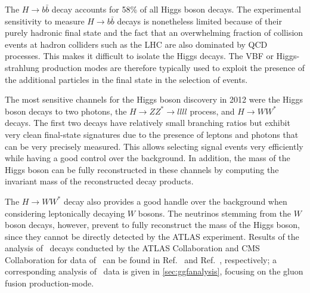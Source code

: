 The $H\rightarrow b\bar{b}$ decay accounts for 58\% of all Higgs boson decays. The experimental sensitivity to measure $H\rightarrow b\bar{b}$ decays is nonetheless limited because of their purely hadronic final state and the fact that an overwhelming fraction of collision events at hadron colliders such as the LHC are also dominated by QCD processes. This makes it difficult to isolate the Higgs decays. The VBF or Higgs-strahlung production modes are therefore typically used to exploit the  presence of the additional particles in the final state in the selection of events.

The most sensitive channels for the Higgs boson discovery in 2012 were the Higgs boson decays to two photons, the $H \rightarrow ZZ^* \rightarrow llll$ process, and $H \to WW^*$ decays.
The first two decays have relatively small branching ratios but exhibit very clean final-state signatures due to the presence of leptons and photons that can be very precisely measured.
This allows selecting signal events very efficiently while having a good control over the background.
In addition, the mass of the Higgs boson can be fully reconstructed in these channels by computing the invariant mass of the reconstructed decay products.

The $H \rightarrow WW^*$ decay also provides a good handle over the background when considering leptonically decaying $W$ bosons.
The neutrinos stemming from the $W$ boson decays, however, prevent to fully reconstruct the mass of the Higgs boson, since they cannot be directly detected by the ATLAS experiment.
Results of the analysis of \HWW\ decays conducted by the ATLAS Collaboration and CMS Collaboration for data of \RunOne\ can be found in Ref.~\cite{PhysRevD.92.012006} and Ref.~\cite{2013arXiv1312.1129C}, respectively; a corresponding analysis of \RunTwo\ data is given in \cref{sec:ggfanalysis}, focusing on the gluon fusion production-mode.

